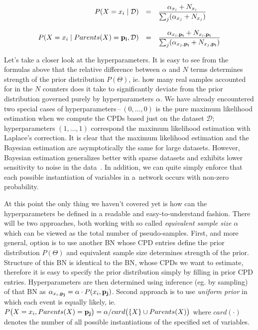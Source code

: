 \documentclass[english,cover]{fitthesis} %
\newcommand{\term}[1]{\emph{#1}}           %
\newcommand{\vars}[1]{{\bold{#1}}}         %
\begin{document}
\begin{equation*}
    \begin{array}{rcl}
    P(X = x_i \mid \mathcal{D}) &
     = &
     \displaystyle\frac
        {\alpha_{x_i} + N_{x_i}}
        {\sum_j (\alpha_{x_j} + N_{x_j})}\\
        & & \\
    P(X = x_i \mid Parents(X) = \vars{p_i}, \mathcal{D}) &
     = &
     \displaystyle\frac
        {\alpha_{x_i, \vars{p_i}} + N_{x_i, \vars{p_i}}}
        {\sum_j (\alpha_{x_j, \vars{p_i}} + N_{x_j, \vars{p_i}})}
    \end{array}
\end{equation*}

Let's take a closer look at the hyperparameters. It is easy to see from the formulas above that the relative difference between $\alpha$ and $N$ terms determines strength of the prior distribution $P(\Theta)$, ie. how many real samples accounted for in the $N$ counters does it take to significantly deviate from the prior distribution governed purely by hyperparameters $\alpha$.
We have already encountered two special cases of hyperparameters\,--\,$(0,\dots,0)$ is the pure maximum likelihood estimation when we compute the CPDs based just on the dataset $\mathcal{D}$; hyperparameters $(1,\dots,1)$ correspond the maximum likelihood estimation with Laplace's correction.
It is clear that the maximum likelihood estimation and the Bayesian estimation are asymptotically the same for large datasets. However, Bayesian estimation generalizes better with sparse datasets and exhibits lower sensitivity to noise in the data~\cite[p.~749]{pgm}. In addition, we can quite simply enforce that each possible instantiation of variables in a~network occurs with non-zero probability.

At this point the only thing we haven't covered yet is how can the hyperparameters be defined in a readable and easy-to-understand fashion. There will be two approaches, both working with so called \term{equivalent sample size} $\alpha$ which can be viewed as the total number of pseudo-samples. First, and more general, option is to use another BN whose CPD entries define the prior distribution $P(\Theta)$ and equivalent sample size determines strength of the prior. Structure of this BN is identical to the BN, whose CPDs we want to estimate, therefore it is easy to specify the prior distribution simply by filling in prior CPD entries. Hyperparameters are then determined using inference (eg. by sampling) of that BN as $\alpha_{x_i,\vars{p_j}} = \alpha \cdot P(x_i, \vars{p_j})$. Second approach is to use \term{uniform prior} in which each event is equally likely, ie. $P\bigl(X = x_i, Parents(X) = \vars{p_j}\bigr) = \alpha / card\bigl(\lbrace X \rbrace \cup Parents(X)\bigr)$ where $card(\cdot)$ denotes the number of all possible instantiations of the specified set of variables.
\end{document}
